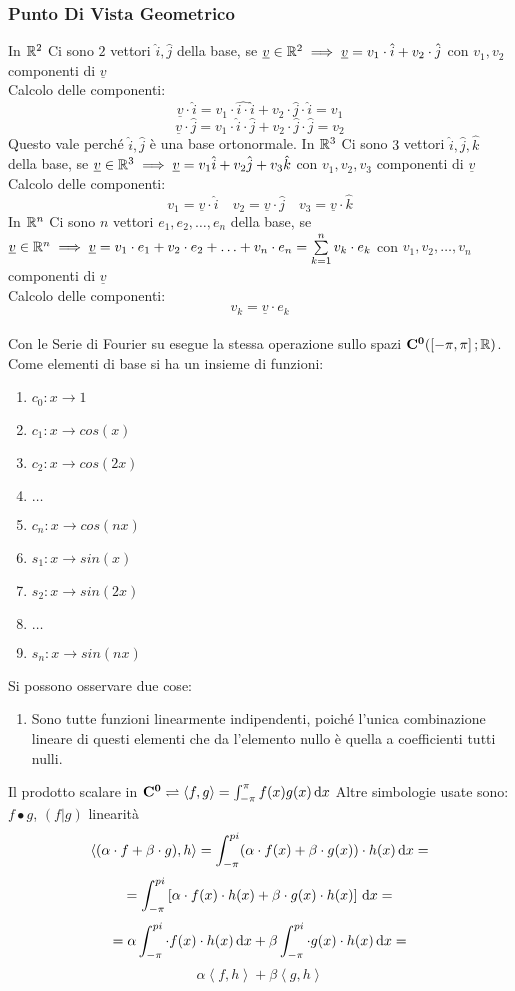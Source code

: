 \subsubsection{Punto Di Vista Geometrico}
In $\mathbb{R}^2$ Ci sono $2$ vettori $\hat{i},\hat{j}$ della base, se $\underline{v}\in \mathbb{R}^2 \implies \underline{v}=v_1\cdot \hat{i}+v_2\cdot \hat{j}$ con $v_1,v_2$ componenti di $\underline{v}$\\
Calcolo delle componenti:
\[\underline{v}\cdot \hat{i} = v_1\cdot \hat{i\cdot }\hat{i}+v_2\cdot \hat{j}\cdot \hat{i}=v_1\]
\[\underline{v}\cdot \hat{j} = v_1\cdot \hat{i}\cdot \hat{j}+v_2\cdot \hat{j}\cdot \hat{j}=v_2\]
Questo vale perché $\hat{i},\hat{j}$ è una base ortonormale.
In $\mathbb{R}^3$ Ci sono $3$ vettori $\hat{i},\hat{j},\hat{k}$ della base, se $\underline{v}\in \mathbb{R}^3 \implies \underline{v}=v_1\hat{i}+v_2\hat{j}+v_3\hat{k}$ con $v_1,v_2,v_3$ componenti di $\underline{v}$\\
Calcolo delle componenti:
\[ v_1=\underline{v}\cdot \hat{i}\quad v_2=\underline{v}\cdot \hat{j}\quad v_3=\underline{v}\cdot \hat{k}  \]
In $\mathbb{R}^n$ Ci sono $n$ vettori $e_1,e_2,\dotsc,e_n$ della base, se $\underline{v}\in \mathbb{R}^n \implies \underline{v}=v_1\cdot e_1+v_2\cdot e_2+\ldots+v_n\cdot e_n=\sum\limits_{k=1}^{n}v_k\cdot e_k$ con $v_1,v_2,\dotsc,v_n$ componenti di $\underline{v}$\\
Calcolo delle componenti:
\[v_k=\underline{v}\cdot e_k\]
\\
Con le Serie di Fourier su esegue la stessa operazione sullo spazi $\mathbf{C^{0}}(\left[-\pi,\pi\right]; \mathbb{R})$. Come elementi di base si ha un insieme di funzioni:
\begin{enumerate}
	\item $c_0:x\to 1$
	\item $c_1:x\to cos(x)$
	\item $c_2:x\to cos(2x)$
	\item $\ldots$
	\item $c_n:x\to cos(nx)$
	\item $s_1:x\to sin(x)$
	\item $s_2:x\to sin(2x)$
	\item $\ldots$
	\item $s_n:x\to sin(nx)$
\end{enumerate}
Si possono osservare due cose:
\begin{enumerate}
	\item Sono tutte funzioni linearmente indipendenti, poiché l'unica combinazione lineare di questi elementi che da l'elemento nullo è quella a coefficienti tutti nulli.
\end{enumerate}
Il prodotto scalare in $\mathbf{C^{0}} \rightleftharpoons \left<f,g\right>=\int_{-\pi}^{\pi}f(x)g(x)\,\mathrm{d}{x}$
Altre simbologie usate sono: $ f\bullet g $, $(f|g)$
\observation linearità
\[\left<(\alpha\cdot f+\beta\cdot g), h \right>= \int_{-\pi}^{pi} (\alpha\cdot f(x)+\beta\cdot g(x))\cdot h(x) \,\mathrm{d}{x}=\]
\[=\int_{-\pi}^{pi} \left[\alpha\cdot f(x)\cdot h(x)+\beta\cdot g(x)\cdot h(x) \right]\,\mathrm{d}{x}= \]
\[=\alpha\int_{-\pi}^{pi} \cdot f(x)\cdot h(x) \,\mathrm{d}{x}+\beta\int_{-\pi}^{pi} \cdot g(x)\cdot h(x) \,\mathrm{d}{x} =\]
\[\alpha\left<f,h\right>+\beta\left<g,h\right>\]

